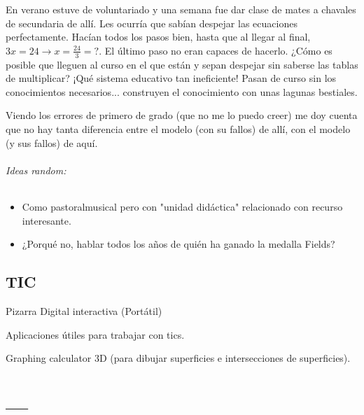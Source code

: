 \documentclass[palatino]{apuntes}
\begin{document}
En verano estuve de voluntariado y una semana fue dar clase de mates a chavales de secundaria de allí. 
%
Les ocurría que sabían despejar las ecuaciones perfectamente. Hacían todos los pasos bien, hasta que al llegar al final, $3x = 24 \to x=\frac{24}{3} = ?$. 
%
El último paso no eran capaces de hacerlo. ¿Cómo es posible que lleguen al curso en el que están y sepan despejar sin saberse las tablas de multiplicar? 
%
¡Qué sistema educativo tan ineficiente! 
%
Pasan de curso sin los conocimientos necesarios... construyen el conocimiento con unas lagunas bestiales.

Viendo los errores de primero de grado (que no me lo puedo creer) me doy cuenta que no hay tanta diferencia entre el modelo (con su fallos) de allí, con el modelo (y sus fallos) de aquí.

\subparagraph{Ideas random:}

\begin{itemize}
	\item Como pastoralmusical pero con "unidad didáctica" relacionado con recurso interesante.
	\item ¿Porqué no, hablar todos los años de quién ha ganado la medalla Fields?
\end{itemize}




\section{TIC}

\begin{defn}[PDi(P)]
Pizarra Digital interactiva (Portátil)
\end{defn}

Aplicaciones útiles para trabajar con tics.

Graphing calculator 3D (para dibujar superficies e intersecciones de superficies).



\appendix

\chapter{---}


\printindex
\end{document}
